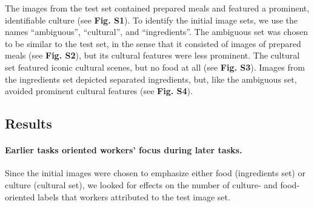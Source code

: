 \documentclass[letterpaper]{article}
\begin{document}
The images from the test set contained prepared meals and featured a 
prominent, identifiable culture (see \textbf{Fig. S1}).
To identify the initial image sets, we use the names ``ambiguous'', 
``cultural'', and ``ingredients''.  The ambiguous set was chosen to
be similar to the test set, in the sense that it consisted of
images of prepared meals (see \textbf{Fig. S2}),  but its cultural 
features were less prominent.  The cultural set featured 
iconic cultural scenes, but no food at all (see \textbf{Fig. S3}).  Images from 
the ingredients set depicted separated ingredients, but, 
like the ambiguous set, avoided prominent cultural features (see 
\textbf{Fig. S4}).
\subsection*{Results}
\begin{figure}
\end{figure}


\paragraph{Earlier tasks oriented workers' focus during later tasks.} 
Since the initial images were chosen to emphasize either food (ingredients set)
or culture (cultural set), we looked for effects on the number of culture- and 
food-oriented labels that workers attributed to the test image set.
\end{document}
